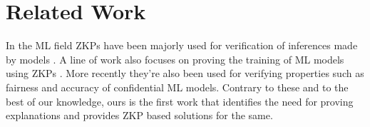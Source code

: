 \section{Related Work}
In the ML field ZKPs have been majorly used for verification of inferences made by models \cite{sun2024zkllm, chen2024zkml, kang2022scaling, PvCNN, sun2023zkdl, Zen, VI2, vCNN, ZKDT, Liu2021zkCNNZK, singh2022zero, fan2023validating}. A line of work also focuses on proving the training of ML models using ZKPs \cite{burkhalter2021rofl, huang2022zkmlaas, ruckel2022fairness, garg2023experimenting, abbaszadeh2024zero}. More recently they're also been used for verifying properties such as fairness \cite{yadav2024fairproofconfidentialcertifiable, confidant, Toreini2023VerifiableFP} and accuracy \cite{zhang2020zero} of confidential ML models.  Contrary to these and to the best of our knowledge, ours is the first work that identifies the need for proving explanations and provides ZKP based solutions for the same.